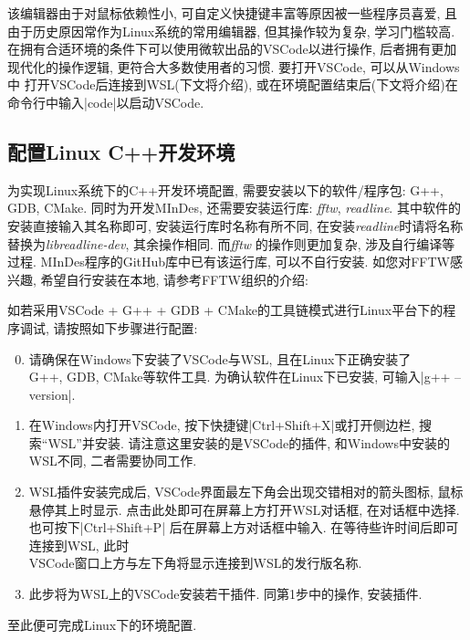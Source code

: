 该编辑器由于对鼠标依赖性小, 可自定义快捷键丰富等原因被一些程序员喜爱, 且由于历史原因常作为Linux系统的常用编辑器, 但其操作较为复杂, 学习门槛较高.
在拥有合适环境的条件下可以使用微软出品的VSCode以进行操作, 后者拥有更加现代化的操作逻辑, 更符合大多数使用者的习惯. 要打开VSCode, 可以从Windows中
打开VSCode后连接到WSL(下文将介绍), 或在环境配置结束后(下文将介绍)在命令行中输入\cverb|code|以启动VSCode.

\subsection{配置Linux C++开发环境}
为实现Linux系统下的C++开发环境配置, 需要安装以下的软件/程序包: G++, GDB, CMake. 同时为开发MInDes, 还需要安装运行库: \emph{fftw}, \emph{readline}.
其中软件的安装直接输入其名称即可, 安装运行库时名称有所不同, 在安装\emph{readline}时请将名称替换为\emph{libreadline-dev}, 其余操作相同. 而\emph{fftw}
的操作则更加复杂, 涉及自行编译等过程. MInDes程序的GitHub库中已有该运行库, 可以不自行安装. 如您对FFTW感兴趣, 
希望自行安装在本地, 请参考FFTW组织的介绍: 

如若采用VSCode + G++ + GDB + CMake的工具链模式进行Linux平台下的程序调试, 请按照如下步骤进行配置:
\begin{enumerate}
      \setcounter{enumi}{-1}
      \item 请确保在Windows下安装了VSCode与WSL, 且在Linux下正确安装了\\G++, GDB, CMake等软件工具. 为确认软件在Linux下已安装, 可输入\cverb|g++ --version|.
      \item 在Windows内打开VSCode, 按下快捷键\cverb|Ctrl+Shift+X|或打开{}侧边栏, 搜索``WSL''并安装. 请注意这里安装的是VSCode的插件, 和Windows中安装的WSL不同,
            二者需要协同工作.
      \item WSL插件安装完成后, VSCode界面最左下角会出现交错相对的箭头图标, 鼠标悬停其上时显示{}.
            点击此处即可在屏幕上方打开WSL对话框, 在对话框中选择{}. 也可按下\cverb|Ctrl+Shift+P|
            后在屏幕上方对话框中输入{}. 在等待些许时间后即可连接到WSL, 此时\\VSCode窗口上方与左下角将显示连接到WSL的发行版名称.
      \item 此步将为WSL上的VSCode安装若干插件. 同第1步中的操作, 安装插件{}.
\end{enumerate}
至此便可完成Linux下的环境配置.

